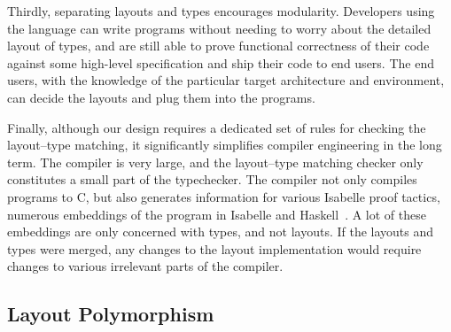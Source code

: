 Thirdly, separating layouts and types encourages modularity.
Developers using the \cogent language can write programs without
needing to worry about the detailed layout of types,
and are still able to prove functional correctness of their code
against some high-level specification and ship their code to end users.
The end users, with the knowledge of the particular target architecture and environment,
can decide the layouts and plug them into the \cogent programs.

Finally, although our design requires a dedicated set of rules for
checking the layout--type matching, it significantly simplifies compiler
engineering in the long term. The \cogent compiler is very large, and
the layout--type matching checker only constitutes a small part of the
typechecker. The compiler not only compiles \cogent programs to C, but
also generates information for various Isabelle proof tactics, numerous
embeddings of the program in Isabelle and Haskell~\citep{Chen:22}. A lot
of these embeddings are only concerned with types, and not layouts. If
the layouts and types were merged, any changes to the layout
implementation would require changes to various irrelevant parts of the
compiler.


\subsection{Layout Polymorphism}

